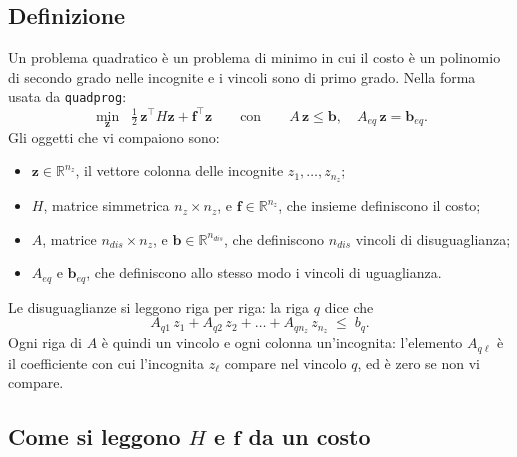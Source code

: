 \documentclass[11pt,a4paper]{article}
\newcommand{\vett}[1]{\boldsymbol{#1}}      %
\begin{document}
\subsection{Definizione}

Un problema quadratico è un problema di minimo in cui il costo è un polinomio
di secondo grado nelle incognite e i vincoli sono di primo grado. Nella forma
usata da \texttt{quadprog}:
\begin{equation}
  \min_{\vett{z}} \;\; \tfrac12\, \vett{z}^\top H \vett{z} + \vett{f}^\top \vett{z}
  \qquad \text{con} \qquad A\,\vett{z} \le \vett{b} , \quad A_{eq}\, \vett{z} = \vett{b}_{eq} .
  \label{eq:qp}
\end{equation}
Gli oggetti che vi compaiono sono:
\begin{itemize}
  \item $\vett{z} \in \mathbb{R}^{n_z}$, il vettore colonna delle incognite
        $z_1, \dots, z_{n_z}$;
  \item $H$, matrice simmetrica $n_z \times n_z$, e $\vett{f} \in \mathbb{R}^{n_z}$,
        che insieme definiscono il costo;
  \item $A$, matrice $n_{dis} \times n_z$, e $\vett{b} \in \mathbb{R}^{n_{dis}}$, che
        definiscono $n_{dis}$ vincoli di disuguaglianza;
  \item $A_{eq}$ e $\vett{b}_{eq}$, che definiscono allo stesso modo i vincoli di
        uguaglianza.
\end{itemize}
Le disuguaglianze si leggono riga per riga: la riga $q$ dice che
\[
  A_{q1}\, z_1 + A_{q2}\, z_2 + \dots + A_{q n_z}\, z_{n_z} \;\le\; b_q .
\]
Ogni riga di $A$ è quindi un vincolo e ogni colonna un'incognita: l'elemento
$A_{q\ell}$ è il coefficiente con cui l'incognita $z_\ell$ compare nel vincolo $q$,
ed è zero se non vi compare.

\subsection{Come si leggono $H$ e $\vett{f}$ da un costo}\label{sec:regola-costo}
\end{document}
